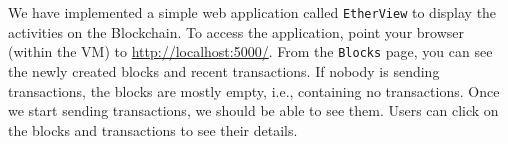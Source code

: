 
We have implemented a simple web application called \texttt{EtherView} to
display the activities on the Blockchain. To access the application,
point your browser (within the VM) to \url{http://localhost:5000/}.
From the \texttt{Blocks} page, you can see the newly created blocks and 
recent transactions. If nobody is sending transactions, the 
blocks are mostly empty, i.e., containing no transactions. Once we 
start sending transactions, we should be able to see them. 
Users can click on the blocks and transactions to see their details.



